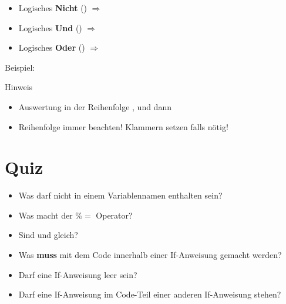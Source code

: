 \begin{frame}
    \slidehead
    \vspace{-0.1cm}
    \begin{itemize}
        \item Logisches \textbf{Nicht} ()  $\Rightarrow$ 
        \item Logisches \textbf{Und} () $\Rightarrow$ 
        \item Logisches \textbf{Oder} ()  $\Rightarrow$ 
    \end{itemize}
    \vspace{-0.15cm}
    \begin{block}{Beispiel:}
    \end{block}
    \vspace{-0.15cm}
    \begin{block}{Hinweis}
        \begin{itemize}
            \item Auswertung in der Reihenfolge ,  und dann 
            \item Reihenfolge immer beachten! Klammern setzen falls nötig!
        \end{itemize}
    \end{block}
\end{frame}

\livecoding

\section{Quiz}
\begin{frame}
    \slidehead
    \begin{itemize}
        \item Was darf nicht in einem Variablennamen enthalten sein?
            \pause
        \item Was macht der \textbf{$\%=$} Operator?%
            \pause
        \item Sind \pythoninline{=} und \pythoninline{==} gleich?
            \pause
        \item Was \textbf{muss} mit dem Code innerhalb einer If-Anweisung gemacht werden?
            \pause
        \item Darf eine If-Anweisung leer sein?
            \pause
        \item Darf eine If-Anweisung im Code-Teil einer anderen If-Anweisung stehen?
    \end{itemize}
\end{frame}




